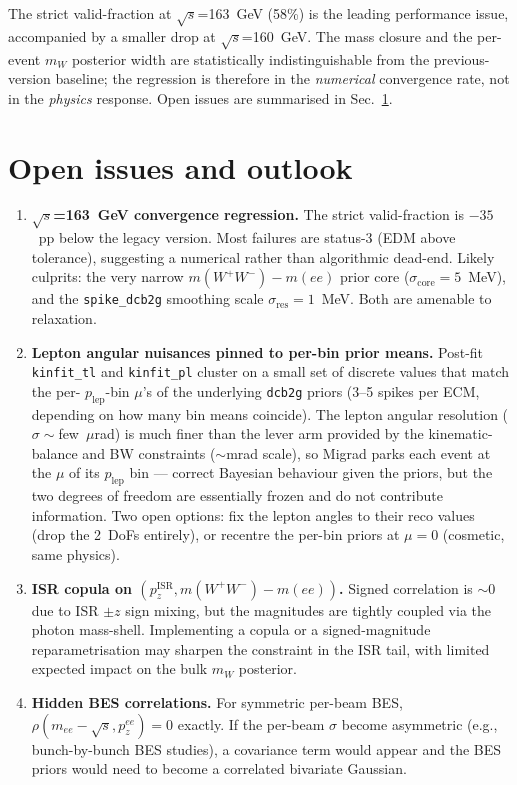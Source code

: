 \documentclass[11pt,a4paper]{article}
\newcommand{\sqs}{\ensuremath{\sqrt{s}}\xspace}
\newcommand{\mW}{\ensuremath{m_W}\xspace}
\newcommand{\WW}{\ensuremath{W^+W^-}\xspace}
\newcommand{\codename}[1]{\texttt{\small #1}}
\begin{document}
The strict valid-fraction at \sqs=163~GeV (58\%) is the leading
performance issue, accompanied by a smaller drop at \sqs=160~GeV. The
mass closure and the per-event \mW posterior width are statistically
indistinguishable from the previous-version baseline; the regression
is therefore in the \emph{numerical} convergence rate, not in the
\emph{physics} response. Open issues are summarised in
Sec.~\ref{sec:open}.


\section{Open issues and outlook}\label{sec:open}

\begin{enumerate}[leftmargin=*]
  \item \textbf{\sqs=163~GeV convergence regression.} The strict
        valid-fraction is $-35$~pp below the legacy version. Most
        failures are status-3 (EDM above tolerance), suggesting a
        numerical rather than algorithmic dead-end. Likely culprits:
        the very narrow $m(\WW)-m(ee)$ prior core
        ($\sigma_\text{core}=5$~MeV), and the
        \codename{spike\_dcb2g} smoothing scale
        $\sigma_\text{res}=1$~MeV. Both are amenable to relaxation.
  \item \textbf{Lepton angular nuisances pinned to per-bin prior
        means.} Post-fit \codename{kinfit\_tl} and \codename{kinfit\_pl}
        cluster on a small set of discrete values that match the per-
        $p_\text{lep}$-bin $\mu$'s of the underlying \codename{dcb2g}
        priors (3--5 spikes per ECM, depending on how many bin means
        coincide). The lepton angular resolution
        ($\sigma\sim$few~$\mu$rad) is much finer than the lever arm
        provided by the kinematic-balance and BW constraints
        ($\sim$mrad scale), so Migrad parks each event at the $\mu$ of
        its $p_\text{lep}$ bin --- correct Bayesian behaviour given the
        priors, but the two degrees of freedom are essentially frozen
        and do not contribute information. Two open options: fix the
        lepton angles to their reco values (drop the 2~DoFs entirely),
        or recentre the per-bin priors at $\mu=0$ (cosmetic, same
        physics).
  \item \textbf{ISR copula on $(p_z^\text{ISR}, m(\WW)-m(ee))$.}
        Signed correlation is $\sim 0$ due to ISR $\pm z$ sign mixing,
        but the magnitudes are tightly coupled via the photon
        mass-shell. Implementing a copula or a signed-magnitude
        reparametrisation may sharpen the constraint in the ISR tail,
        with limited expected impact on the bulk \mW posterior.
  \item \textbf{Hidden BES correlations.} For symmetric per-beam BES,
        $\rho(m_{ee}-\sqs, p_z^{ee}) = 0$ exactly. If the per-beam
        $\sigma$ become asymmetric (e.g., bunch-by-bunch BES studies),
        a covariance term would appear and the BES priors would need
        to become a correlated bivariate Gaussian.
\end{enumerate}
\end{document}
